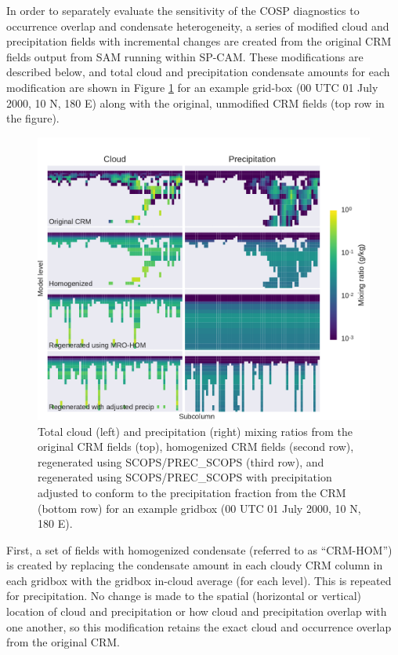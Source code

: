 In order to separately evaluate the sensitivity of the COSP diagnostics to occurrence overlap and condensate heterogeneity, a series of modified cloud and precipitation fields with incremental changes are created from the original CRM fields output from SAM running within SP-CAM. These modifications are described below, and total cloud and precipitation condensate amounts for each modification are shown in Figure \ref{sg_mxratio_example} for an example grid-box (00 UTC 01 July 2000, 10 N, 180 E) along with the original, unmodified CRM fields (top row in the figure).

\begin{figure}
    \centering
    \includegraphics[width=\columnwidth]{graphics/mxratio_mro-hom.pdf}
    \caption{Total cloud (left) and precipitation (right) mixing ratios from the original CRM fields (top), homogenized CRM fields (second row), regenerated using SCOPS/PREC\_SCOPS (third row), and regenerated using SCOPS/PREC\_SCOPS with precipitation adjusted to conform to the precipitation fraction from the CRM (bottom row) for an example gridbox (00 UTC 01 July 2000, 10 N, 180 E).} 
    \label{sg_mxratio_example} 
\end{figure}

First, a set of fields with homogenized condensate (referred to as ``CRM-HOM'') is created by replacing the condensate amount in each cloudy CRM column in each gridbox with the gridbox in-cloud average (for each level). This is repeated for precipitation. No change is made to the spatial (horizontal or vertical) location of cloud and precipitation or how cloud and precipitation overlap with one another, so this modification retains the exact cloud and occurrence overlap from the original CRM.


